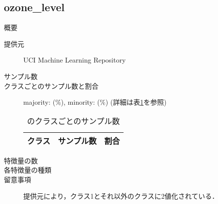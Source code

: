 \subsection{ozone\_level}
\begin{description}
    \item[概要] \cite{}
    \item[提供元] UCI Machine Learning Repository
    \item[サンプル数] 
    \item[クラスごとのサンプル数と割合] majority:  (\%), minority:  (\%) (詳細は表\ref{tab:}を参照)

        \begin{table}
            \centering
            \caption{のクラスごとのサンプル数}
            \label{tab:}
            \begin{tabular}{lrc} \hline
                \multicolumn{1}{c}{クラス}&
                \multicolumn{1}{c}{サンプル数}&
                \multicolumn{1}{c}{割合}\\
                \hline
                \hline

                \hline
            \end{tabular}
        \end{table}

    \item[特徴量の数] 
    \item[各特徴量の種類] \mbox{}
        
    \item[留意事項] 提供元により，クラス1とそれ以外のクラスに2値化されている．
\end{description}


